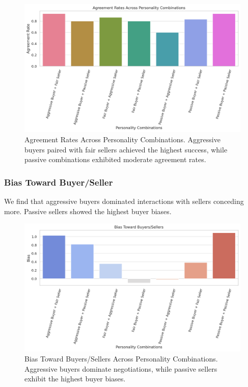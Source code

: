 \documentclass[11pt]{article}
\begin{document}
\begin{figure}[h]
    \centering
    \includegraphics[width=1\linewidth]{figures/personality/agreement_rates.png}
    \caption{Agreement Rates Across Personality Combinations. Aggressive buyers paired with fair sellers achieved the highest success, while passive combinations exhibited moderate agreement rates.}
    \label{fig:agreement_rates}
\end{figure}

\subsubsection{Bias Toward Buyer/Seller}
We find that aggressive buyers dominated interactions with sellers conceding more. Passive sellers showed the highest buyer biases.

\begin{figure}[h]
    \centering
    \includegraphics[width=1\linewidth]{figures/personality/bias_scores.png}
    \caption{Bias Toward Buyers/Sellers Across Personality Combinations. Aggressive buyers dominate negotiations, while passive sellers exhibit the highest buyer biases.}
    \label{fig:bias_scores}
\end{figure}
\end{document}
